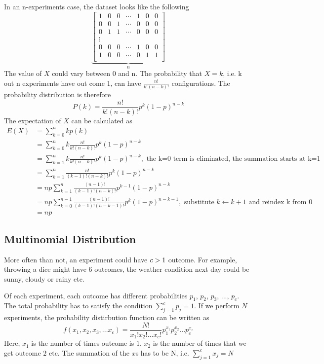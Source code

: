 \documentclass[12pt, oneside]{article}
\begin{document}
In an n-experiments case, the dataset looks like the following
\[
\underbrace{
\begin{bmatrix}
    1 & 0  &0 &\cdots &1 & 0  &0  \\
    0 & 0  &1 &\cdots &0 & 0  &0 \\
    0 & 1  &1 &\cdots &0 & 0  &0 \\
    \vdots \\
    0 &0  &0 &\cdots &1& 0  &0\\
    1 & 0  &0 &\cdots &0 & 1 &1\\
\end{bmatrix}
}_{n}
\]
The value of $X$ could vary between 0 and n. The probability that $X=k$, i.e. k out n experiments have out come 1, can have $\frac{n!}{k!(n-k)!}$ configurations. The probability distribution is therefore
$$P(k)=\frac{n!}{k!(n-k)!}p^k(1-p)^{n-k}$$
The expectation of $X$ can be calculated as
\begin{align*}
E(X)&=\sum\limits_{k=0}^{n}kp(k)\\
&=\sum\limits_{k=0}^{n}k\frac{n!}{k!(n-k)!}p^k(1-p)^{n-k}\\ 
&=\sum\limits_{k=1}^{n}k\frac{n!}{k!(n-k)!}p^{k}(1-p)^{n-k}, \text{ the k=0 term is eliminated, the summation starts at k=1}\\
&=\sum\limits_{k=1}^{n}\frac{n!}{(k-1)!(n-k)!}p^{k}(1-p)^{n-k}\\
&=np\sum\limits_{k=1}^{n}\frac{(n-1)!}{(k-1)!(n-k)!}p^{k-1}(1-p)^{n-k}\\
&=np\sum\limits_{k=0}^{n-1}\frac{(n-1)!}{(k-1)!(n-k-1)!}p^{k}(1-p)^{n-k-1}, \text{ substitute }k\leftarrow k+1 \text{ and reindex k from 0}\\
&=np
\end{align*}
\subsection{Multinomial Distribution}

More often than not, an experiment could have $\mathnormal{c}>1$ outcome. For example, throwing a dice might have 6 outcomes, the weather condition next day could be sunny, cloudy or rainy etc. 

Of each experiment, each outcome has different probabilities ${p_1}$, ${p_2}$, ${p_3}$, ..., ${p_c}$. The total probability has to satisfy the condition ${\sum\limits_{j=1}^c p_j=1}$. If we perform $\mathnormal{N}$ experiments, the probability distirbution function can be written as 
$${f(x_1, x_2, x_3, ... x_c)=\frac{N!}{x_1! x_2! ... x_c!} p_1^{x_1} p_2^{x_2} ... p_c^{x_c}}$$
Here, $x_1$ is the number of times outcome is $1$, $x_2$ is the number of times that we get outcome $2$ etc. The summation of the $x$s has to be N, i.e. $\sum\limits_{j=1}^{c}x_j=N$
\end{document}
